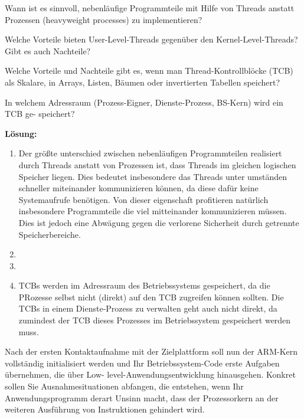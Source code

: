 

\begin{description}

Wann ist es sinnvoll, nebenläufige Programmteile mit Hilfe von Threads anstatt Prozessen
(heavyweight processes) zu implementieren?

Welche Vorteile bieten User-Level-Threads gegenüber den Kernel-Level-Threads? Gibt es
auch Nachteile?

Welche Vorteile und Nachteile gibt es, wenn man Thread-Kontrollblöcke (TCB) als Skalare, in
Arrays, Listen, Bäumen oder invertierten Tabellen speichert?

In welchem Adressraum (Prozess-Eigner, Dienste-Prozess, BS-Kern) wird ein TCB ge-
speichert?

\textbf{Lösung:}\\
\begin{enumerate}
	\item Der größte unterschied zwischen nebenläufigen Programmteilen realisiert durch Threads anstatt von Prozessen ist, dass Threads im gleichen logischen Speicher liegen. Dies bedeutet insbesondere das Threads unter umständen schneller miteinander kommunizieren können, da diese dafür keine Systemaufrufe benötigen.
Von dieser eigenschaft profitieren natürlich insbesondere Programmteile die viel mitteinander kommunizieren müssen. Dies ist jedoch eine Abwägung gegen die verlorene Sicherheit durch getrennte Speicherbereiche.
	\item \todo{}
	\item \todo{}
	\item TCBs werden im Adressraum des Betriebssystems gespeichert, da die PRozesse selbst nicht (direkt) auf den TCB zugreifen können sollten. Die TCBs in einem Dienste-Prozess zu verwalten geht auch nicht direkt, da zumindest der TCB dieses Prozesses im Betriebssystem gespeichert werden muss.
\end{enumerate}




Nach der ersten Kontaktaufnahme mit der Zielplattform soll nun der ARM-Kern vollständig
initialisiert werden und Ihr Betriebssystem-Code erste Aufgaben übernehmen, die über Low-
level-Anwendungsentwicklung hinausgehen. Konkret sollen Sie Ausnahmesituationen
abfangen, die entstehen, wenn Ihr Anwendungsprogramm derart Unsinn macht, dass der
Prozessorkern an der weiteren Ausführung von Instruktionen gehindert wird.


\end{description}
